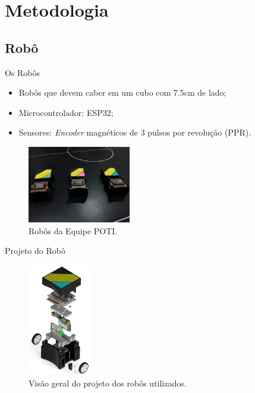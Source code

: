 \section{Metodologia}
\subsection{Robô}

\begin{frame}{Os Robôs}

\begin{itemize}
    \item Robôs que devem caber em um cubo com 7.5cm de lado;
    \item Microcontrolador: ESP32;
    \item Sensores: \emph{Encoder} magnéticos de $3$ pulsos por revolução (PPR).
\end{itemize}
    
    \begin{figure}
        \centering
        \includegraphics[width=0.4\textwidth]{figuras/robos/robos_capa_aberta.jpg}
        \caption{Robôs da Equipe POTI.}
    \end{figure}
\end{frame}


\begin{frame}{Projeto do Robô}
    \begin{figure}
        \centering
        \includegraphics[width=0.25\textwidth ]{figuras/robos/robo_completo_explodido.png}
        \caption{Visão geral do projeto dos robôs utilizados.}
    \end{figure}
\end{frame}

